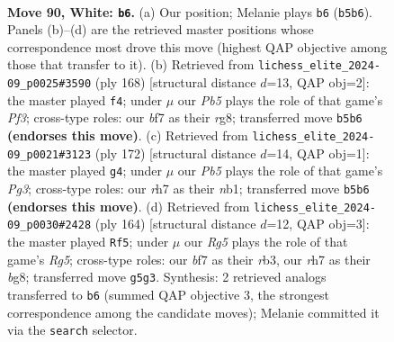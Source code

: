 \documentclass[11pt]{article}
\begin{document}
\clearpage

\begin{figure}[p]\centering
\begin{subfigure}{0.46\textwidth}\centering
\resizebox{\linewidth}{!}{%
\newchessgame
\chessboard[
  setfen={R7/5b1r/3k4/1P4R1/4K3/8/8/8 w - - 7 90},
  showmover=false,
  pgfstyle=straightmove, color=movearrow, markmove={b5-b6}
]}
\caption{}
\end{subfigure}\hfill
\begin{subfigure}{0.46\textwidth}\centering
\resizebox{\linewidth}{!}{%
\newchessgame
\chessboard[
  setfen={6r1/8/5K2/8/3k4/R4P2/8/8 w - - 5 85},
  showmover=false,
  pgfstyle=straightmove, color=movearrow, markmove={f3-f4}
]}
\caption{}
\end{subfigure}
\\[4pt]
\begin{subfigure}{0.46\textwidth}\centering
\resizebox{\linewidth}{!}{%
\newchessgame
\chessboard[
  setfen={R7/8/8/2b1K3/2k5/6P1/8/1n6 w - - 1 87},
  showmover=false,
  pgfstyle=straightmove, color=movearrow, markmove={g3-g4}
]}
\caption{}
\end{subfigure}\hfill
\begin{subfigure}{0.46\textwidth}\centering
\resizebox{\linewidth}{!}{%
\newchessgame
\chessboard[
  setfen={6b1/6P1/3k4/6R1/8/1r6/3K4/8 w - - 3 83},
  showmover=false,
  pgfstyle=straightmove, color=movearrow, markmove={g5-f5}
]}
\caption{}
\end{subfigure}
\caption{\textbf{Move 90, White: \texttt{b6}.} (a) Our position; Melanie plays \texttt{b6} (\texttt{b5b6}). Panels (b)--(d) are the retrieved master positions whose correspondence most drove this move (highest QAP objective among those that transfer to it). (b) Retrieved from \texttt{lichess\_elite\_2024-09\_p0025\#3590} (ply 168) [structural distance $d$=13, QAP obj=2]: the master played \texttt{f4}; under $\mu$ our \emph{Pb5} plays the role of that game's \emph{Pf3}; cross-type roles: our \emph{b}f7 as their \emph{r}g8; transferred move \texttt{b5b6} \textbf{(endorses this move)}. (c) Retrieved from \texttt{lichess\_elite\_2024-09\_p0021\#3123} (ply 172) [structural distance $d$=14, QAP obj=1]: the master played \texttt{g4}; under $\mu$ our \emph{Pb5} plays the role of that game's \emph{Pg3}; cross-type roles: our \emph{r}h7 as their \emph{n}b1; transferred move \texttt{b5b6} \textbf{(endorses this move)}. (d) Retrieved from \texttt{lichess\_elite\_2024-09\_p0030\#2428} (ply 164) [structural distance $d$=12, QAP obj=3]: the master played \texttt{Rf5}; under $\mu$ our \emph{Rg5} plays the role of that game's \emph{Rg5}; cross-type roles: our \emph{b}f7 as their \emph{r}b3, our \emph{r}h7 as their \emph{b}g8; transferred move \texttt{g5g3}. Synthesis: 2 retrieved analogs transferred to \texttt{b6} (summed QAP objective 3, the strongest correspondence among the candidate moves); Melanie committed it via the \texttt{search} selector.}
\label{fig:thought-m178}
\end{figure}
\end{document}
